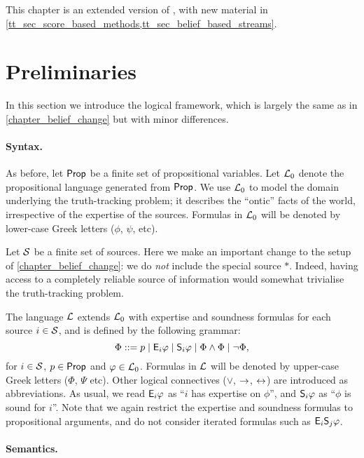 This chapter is an extended version of \textcite{singleton_booth_tt_2022}, with
new material in \cref{tt_sec_score_based_methods,tt_sec_belief_based_streams}.

\section{Preliminaries}
\label{tt_sec_preliminaries}

In this section we introduce the logical framework, which is largely the same
as in \cref{chapter_belief_change} but with minor differences.

\paragraph{Syntax.}

As before, let $\propvars$ be a finite set of propositional variables. Let $\Lprop$
denote the propositional language generated from $\propvars$. We use $\Lprop$
to model the domain underlying the truth-tracking problem; it describes the
``ontic'' facts of the world, irrespective of the expertise of the sources.
Formulas in $\Lprop$ will be denoted by lower-case Greek letters ($\phi$,
$\psi$, etc).

Let $\srcs$ be a finite set of sources. Here we make an important change to the
setup of \cref{chapter_belief_change}: we do \emph{not} include the special
source $\ast$. Indeed, having access to a completely reliable source of
information would somewhat trivialise the truth-tracking problem.

The language $\L$ extends $\Lprop$ with
expertise and soundness formulas for each source $i \in \srcs$, and is defined
by the following grammar:
\[
    \Phi
    ::= p
    \mid \E_i\phi
    \mid \S_i\phi
    \mid \Phi \land \Phi
    \mid \neg\Phi,
\]
for $i \in \srcs$, $p \in \propvars$ and $\phi \in \Lprop$. Formulas in $\L$
will be denoted by upper-case Greek letters ($\Phi$, $\Psi$ etc). Other logical
connectives ($\lor$, $\limplies$, $\liff$) are introduced as abbreviations.  As
usual, we read $\E_i\phi$ as ``$i$ has expertise on $\phi$'', and $\S_i\phi$ as
``$\phi$ is sound for $i$''. Note that we again restrict the expertise and
soundness formulas to propositional arguments, and do not consider iterated
formulas such as $\E_i\S_j\phi$.

\paragraph{Semantics.}

